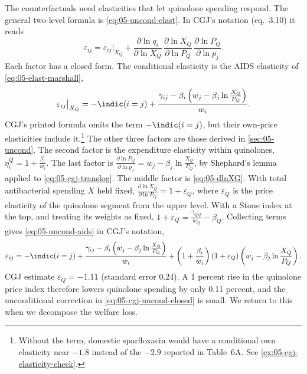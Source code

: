  The counterfactuals need elasticities that let quinolone spending respond.
The general two-level formula is \eqref{eq:05-uncond-elast}. In CGJ's notation (eq.~3.10) it reads
\begin{equation}\label{eq:05-cgj-uncond}
\varepsilon_{ij} = \varepsilon_{ij}\big|_{X_Q}
+ \frac{\partial\ln q_i}{\partial\ln X_Q}\,\frac{\partial\ln X_Q}{\partial\ln P_Q}\,\frac{\partial\ln P_Q}{\partial\ln p_j}.
\end{equation}
Each factor has a closed form. The conditional elasticity is the AIDS elasticity of \eqref{eq:05-elast-marshall},
\begin{equation}\label{eq:05-cgj-cond}
\varepsilon_{ij}\big|_{X_Q} = -\indic(i=j) + \frac{\gamma_{ij} - \beta_i\left(w_j - \beta_j\ln\frac{X_Q}{P_Q}\right)}{w_i}.
\end{equation}
CGJ's printed formula omits the term $-\indic(i=j)$, but their own-price elasticities include it.\footnote{Without
the term, domestic sparfloxacin would have a conditional own elasticity near $-1.8$ instead of the $-2.9$ reported in
Table~6A. See \cref{ex:05-cgj-elasticity-check}.} The other three factors are those derived in
\cref{sec:05-uncond}. The second factor is the expenditure elasticity within quinolones, $\eta_i^Q = 1 +
\frac{\beta_i}{w_i}$. The last factor is $\frac{\partial\ln P_Q}{\partial\ln p_j} = w_j - \beta_j\ln\frac{X_Q}{P_Q}$,
by Shephard's lemma applied to \eqref{eq:05-cgj-translog}. The middle factor is \eqref{eq:05-dlnXG}. With total
antibacterial spending $X$ held fixed, $\frac{\partial\ln X_Q}{\partial\ln P_Q} = 1 + \varepsilon_Q$, where
$\varepsilon_Q$ is the price elasticity of the quinolone segment from the upper level. With a Stone index at the top,
and treating its weights as fixed, $1 + \varepsilon_Q = \frac{\gamma_{QQ}}{w_Q} - \beta_Q$. Collecting terms gives
\eqref{eq:05-uncond-aids} in CGJ's notation,
\begin{equation}\label{eq:05-cgj-uncond-closed}
\varepsilon_{ij} = -\indic(i=j) + \frac{\gamma_{ij} - \beta_i\left(w_j - \beta_j\ln\frac{X_Q}{P_Q}\right)}{w_i}
+ \left(1 + \frac{\beta_i}{w_i}\right)\left(1 + \varepsilon_Q\right)\left(w_j - \beta_j\ln\frac{X_Q}{P_Q}\right).
\end{equation}
CGJ estimate $\varepsilon_Q = -1.11$ (standard error 0.24). A 1 percent rise in the quinolone price index therefore
lowers quinolone spending by only 0.11 percent, and the unconditional correction in \eqref{eq:05-cgj-uncond-closed} is
small. We return to this when we decompose the welfare loss.

